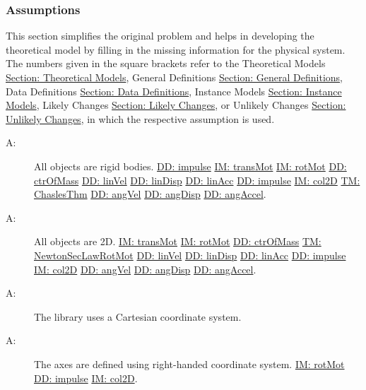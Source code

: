 \documentclass[12pt]{article}
\newcounter{assumpnum}
\newcommand{\atheassumpnum}{A\theassumpnum}
\begin{document}
\subsubsection{Assumptions}
\label{Sec:Assumps}
This section simplifies the original problem and helps in developing the theoretical model by filling in the missing information for the physical system. The numbers given in the square brackets refer to the Theoretical Models \hyperref[Sec:TMs]{Section: Theoretical Models}, General Definitions \hyperref[Sec:GDs]{Section: General Definitions}, Data Definitions \hyperref[Sec:DDs]{Section: Data Definitions}, Instance Models \hyperref[Sec:IMs]{Section: Instance Models}, Likely Changes \hyperref[Sec:LCs]{Section: Likely Changes}, or Unlikely Changes \hyperref[Sec:UCs]{Section: Unlikely Changes}, in which the respective assumption is used.
\begin{description}
\item[\atheassumpnum\label{A:objectTy}:]All objects are rigid bodies. \hyperref[DD:impulse]{DD: impulse} \hyperref[IM:transMot]{IM: transMot} \hyperref[IM:rotMot]{IM: rotMot} \hyperref[DD:ctrOfMass]{DD: ctrOfMass} \hyperref[DD:linVel]{DD: linVel} \hyperref[DD:linDisp]{DD: linDisp} \hyperref[DD:linAcc]{DD: linAcc} \hyperref[DD:impulse]{DD: impulse} \hyperref[IM:col2D]{IM: col2D} \hyperref[TM:ChaslesThm]{TM: ChaslesThm} \hyperref[DD:angVel]{DD: angVel} \hyperref[DD:angDisp]{DD: angDisp} \hyperref[DD:angAccel]{DD: angAccel}.
\end{description}
\begin{description}
\item[\atheassumpnum\label{A:objectDimension}:]All objects are 2D. \hyperref[IM:transMot]{IM: transMot} \hyperref[IM:rotMot]{IM: rotMot} \hyperref[DD:ctrOfMass]{DD: ctrOfMass} \hyperref[TM:NewtonSecLawRotMot]{TM: NewtonSecLawRotMot} \hyperref[DD:linVel]{DD: linVel} \hyperref[DD:linDisp]{DD: linDisp} \hyperref[DD:linAcc]{DD: linAcc} \hyperref[DD:impulse]{DD: impulse} \hyperref[IM:col2D]{IM: col2D} \hyperref[DD:angVel]{DD: angVel} \hyperref[DD:angDisp]{DD: angDisp} \hyperref[DD:angAccel]{DD: angAccel}.
\end{description}
\begin{description}
\item[\atheassumpnum\label{A:coordinateSystemTy}:]The library uses a Cartesian coordinate system.
\end{description}
\begin{description}
\item[\atheassumpnum\label{A:axesDefined}:]The axes are defined using right-handed coordinate system. \hyperref[IM:rotMot]{IM: rotMot} \hyperref[DD:impulse]{DD: impulse} \hyperref[IM:col2D]{IM: col2D}.
\end{description}
\end{document}
